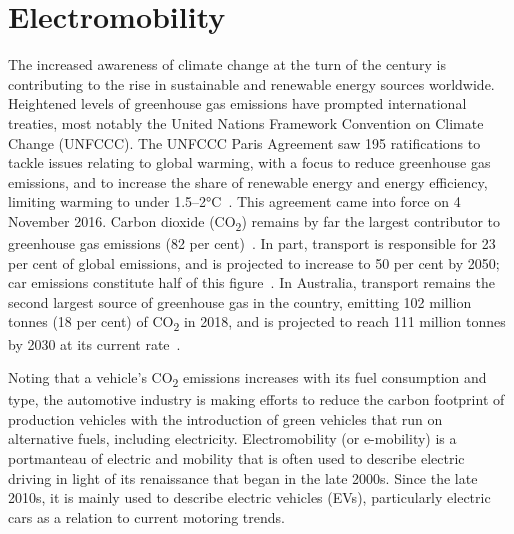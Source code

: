 \section{Electromobility}
The increased awareness of climate change at the turn of the century is contributing to the rise in sustainable and renewable energy sources worldwide. Heightened levels of greenhouse gas emissions have prompted international treaties, most notably the United Nations Framework Convention on Climate Change (UNFCCC). The UNFCCC Paris Agreement saw 195 ratifications to tackle issues relating to global warming, with a focus to reduce greenhouse gas emissions, and to increase the share of renewable energy and energy efficiency, limiting warming to under 1.5--2°C~\cite{rogelj_paris_2016}. This agreement came into force on 4 November 2016. Carbon dioxide (CO\textsubscript{2}) remains by far the largest contributor to greenhouse gas emissions (82 per cent)~\cite{united_states_environmental_protection_agency_inventory_2019}. In part, transport is responsible for 23 per cent of global emissions, and is projected to increase to 50 per cent by 2050; car emissions constitute half of this figure~\cite{santos_road_2017}. In Australia, transport remains the second largest source of greenhouse gas in the country, emitting 102 million tonnes (18 per cent) of CO\textsubscript{2} in 2018, and is projected to reach 111 million tonnes by 2030 at its current rate~\cite{department_of_the_environment_and_energy_australias_2018}. 


Noting that a vehicle's CO\textsubscript{2} emissions increases with its fuel consumption and type, the automotive industry is making efforts to reduce the carbon footprint of production vehicles with the introduction of green vehicles that run on alternative fuels, including electricity. Electromobility (or e-mobility) is a portmanteau of electric and mobility that is often used to describe electric driving in light of its renaissance that began in the late 2000s. Since the late 2010s, it is mainly used to describe electric vehicles (EVs), particularly electric cars as a relation to current motoring trends.

